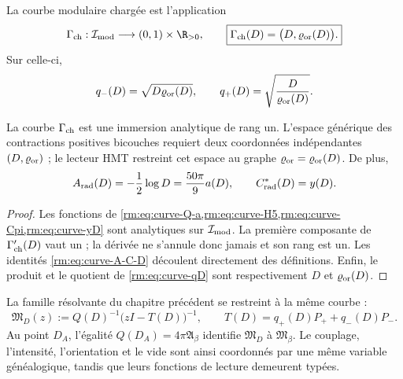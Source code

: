 \begin{definition}
\label{rm:def:charged-modular-curve} La courbe modulaire chargée est l’application
\begin{equation}
 \Gamma_{\rm ch}:\mathcal I_{\rm mod}\longrightarrow(0,1)\times\R_{>0},
 \qquad
 \boxed{\Gamma_{\rm ch}(D)=\bigl(D,\varrho_{\rm or}(D)\bigr).}
 \label{rm:eq:curve-Gamma}
\end{equation}
Sur celle-ci,
\begin{equation}
 q_-(D)=\sqrt{D\varrho_{\rm or}(D)},
 \qquad
 q_+(D)=\sqrt{\frac{D}{\varrho_{\rm or}(D)}}.
 \label{rm:eq:curve-qD}
\end{equation}
\end{definition}

\begin{theorem}
\label{rm:thm:curve-rank-one} La courbe \(\Gamma_{\rm ch}\) est une immersion analytique de rang un. L’espace générique des contractions positives bicouches requiert deux coordonnées indépendantes \((D,\varrho_{\rm or})\) ; le lecteur HMT restreint cet espace au graphe \(\varrho_{\rm or}=\varrho_{\rm or}(D)\). De plus,
\begin{equation}
 A_{\rm rad}(D)=-\frac12\log D
 =\frac{50\pi}{9}a(D),
 \qquad
 C^*_{\rm rad}(D)=y(D).
 \label{rm:eq:curve-A-C-D}
\end{equation}
\end{theorem}

\begin{proof}
Les fonctions de \cref{rm:eq:curve-Q-a,rm:eq:curve-H5,rm:eq:curve-Cpi,rm:eq:curve-yD} sont analytiques sur \(\mathcal I_{\rm mod}\). La première composante de \(\Gamma_{\rm ch}'(D)\) vaut un ; la dérivée ne s’annule donc jamais et son rang est un. Les identités \cref{rm:eq:curve-A-C-D} découlent directement des définitions. Enfin, le produit et le quotient de \cref{rm:eq:curve-qD} sont respectivement \(D\) et \(\varrho_{\rm or}(D)\).
\end{proof}

La famille résolvante du chapitre précédent se restreint à la même courbe :
\begin{equation}
 \mathfrak M_D(z)
 :=Q(D)^{-1}\bigl(zI-T(D)\bigr)^{-1},
 \qquad
 T(D)=q_+(D)P_++q_-(D)P_-.
 \label{rm:eq:curve-resolvent-D}
\end{equation}
Au point \(D_A\), l’égalité \(Q(D_A)=4\pi\mathfrak A_\beta\) identifie \(\mathfrak M_D\) à \(\mathfrak M_\beta\). Le couplage, l’intensité, l’orientation et le vide sont ainsi coordonnés par une même variable généalogique, tandis que leurs fonctions de lecture demeurent typées.

